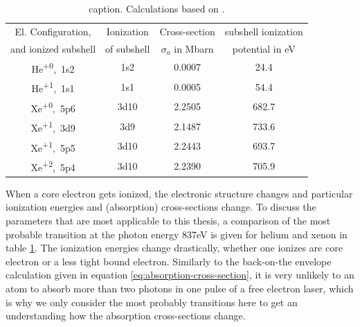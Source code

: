 \begin{table}
	\centering
		\begin{tabular}{ | c | c | c | c | }
		\hline
			El. Configuration, & Ionization & Cross-section  & subshell ionization  \\
			and ionized subshell & of subshell & $\sigma_{a}$ in Mbarn & potential in eV \\ \hline
			He\textsuperscript{+0},\ 1s2 & 1s2 & 0.0007 & 24.4 \\ \hline
			He\textsuperscript{+1},\ 1s1 & 1s1 & 0.0005 & 54.4 \\ \hline
			Xe\textsuperscript{+0},\ 5p6 & 3d10 & 2.2505 & 682.7 \\ \hline
			Xe\textsuperscript{+1},\ 3d9 & 3d9 & 2.1487 & 733.6 \\ \hline
			Xe\textsuperscript{+1},\ 5p5 & 3d10 & 2.2443 & 693.7 \\ \hline
			Xe\textsuperscript{+2},\ 5p4 & 3d10 & 2.2390 & 705.9 \\ \hline
		\end{tabular}
	\caption{caption. Calculations based on \citep{Cowan-1981-Cal}.}
	\label{tab:helium-xenon-ionization}
\end{table}
When a core electron gets ionized, the electronic structure changes and particular ionization energies and (absorption) cross-sections change. To discuss the parameters that are most applicable to this thesis, a comparison of the most probable transition at the photon energy 837eV is given for helium and xenon in table \ref{tab:helium-xenon-ionization}. The ionization energies change drastically, whether one ionizes are core electron or a less tight bound electron. Similarly to the back-on-the envelope calculation given in equation \eqref{eq:absorption-cross-section}, it is very unlikely to an atom to absorb more than two photons in one pulse of a free electron laser, which is why we only consider the most probably transitions here to get an understanding how the absorption cross-sections change.\\
